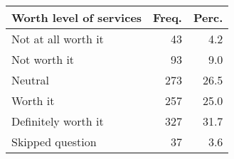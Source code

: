 \begin{table}[ht]
\centering
\begin{tabular}{lrr}
  \hline
Worth level of services & Freq. & Perc. \\ 
  \hline
Not at all worth it & 43 & 4.2 \\ 
  Not worth it & 93 & 9.0 \\ 
  Neutral & 273 & 26.5 \\ 
  Worth it & 257 & 25.0 \\ 
  Definitely worth it & 327 & 31.7 \\ 
  Skipped question & 37 & 3.6 \\ 
   \hline
\end{tabular}
\end{table}
